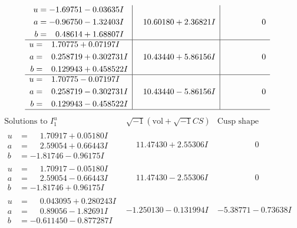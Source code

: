 \documentclass[1p]{elsarticle_modified}
\theoremstyle{definition}
\newcommand{\I}{\sqrt{-1}}
\begin{document}
$$\begin{array}{c|c|c}
\begin{aligned}
u &= -1.69751 - 0.03635 I \\
a &= -0.96750 - 1.32403 I \\
b &= \phantom{-}0.48614 + 1.68807 I\end{aligned}
 & \phantom{-}10.60180 + 2.36821 I & \phantom{-0.000000 } 0 \\ \hline\begin{aligned}
u &= \phantom{-}1.70775 + 0.07197 I \\
a &= \phantom{-}0.258719 + 0.302731 I \\
b &= \phantom{-}0.129943 + 0.458522 I\end{aligned}
 & \phantom{-}10.43440 + 5.86156 I & \phantom{-0.000000 } 0 \\ \hline\begin{aligned}
u &= \phantom{-}1.70775 - 0.07197 I \\
a &= \phantom{-}0.258719 - 0.302731 I \\
b &= \phantom{-}0.129943 - 0.458522 I\end{aligned}
 & \phantom{-}10.43440 - 5.86156 I & \phantom{-0.000000 } 0\\
 \hline 
 \end{array}$$\newpage$$\begin{array}{c|c|c}  
\text{Solutions to }I^u_{1}& \I (\text{vol} + \sqrt{-1}CS) & \text{Cusp shape}\\
 \hline 
\begin{aligned}
u &= \phantom{-}1.70917 + 0.05180 I \\
a &= \phantom{-}2.59054 + 0.66443 I \\
b &= -1.81746 - 0.96175 I\end{aligned}
 & \phantom{-}11.47430 + 2.55306 I & \phantom{-0.000000 } 0 \\ \hline\begin{aligned}
u &= \phantom{-}1.70917 - 0.05180 I \\
a &= \phantom{-}2.59054 - 0.66443 I \\
b &= -1.81746 + 0.96175 I\end{aligned}
 & \phantom{-}11.47430 - 2.55306 I & \phantom{-0.000000 } 0 \\ \hline\begin{aligned}
u &= \phantom{-}0.043095 + 0.280243 I \\
a &= \phantom{-}0.89056 - 1.82691 I \\
b &= -0.611450 - 0.877287 I\end{aligned}
 & -1.250130 - 0.131994 I & -5.38771 - 0.73638 I \\ \hline\begin{aligned}

\end{aligned}
\end{array}$$
\end{document}
